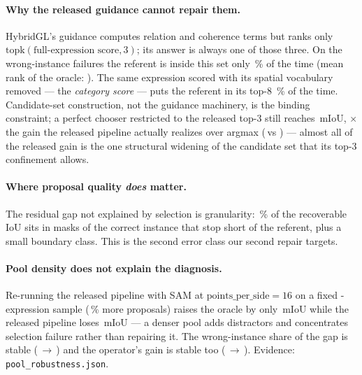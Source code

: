 \paragraph{Why the released guidance cannot repair them.}
HybridGL's guidance computes relation and coherence terms but ranks only
$\mathrm{topk}(\text{full-expression score}, 3)$; its answer is always one of
those three. On the wrong-instance failures the referent is inside this set
only \oracleInTopThreePct\,\% of the time (mean rank of the oracle:
\meanOracleRank). The same expression scored with its spatial vocabulary
removed --- the \emph{category score} --- puts the referent in its top-8
\goodSetPct\,\% of the time. Candidate-set construction, not the guidance
machinery, is the binding constraint; a perfect chooser restricted to the
released top-3 still reaches \topThreeCeiling\,mIoU, \topThreeCeilingRatio$\times$
the gain the released pipeline actually realizes over argmax
(\relMIoU\,vs \argmaxMIoU) --- almost all of the released gain is the one
structural widening of the candidate set that its top-3 confinement allows.

\paragraph{Where proposal quality \emph{does} matter.}
The residual gap not explained by selection is granularity:
\usSharePct\,\% of the recoverable IoU sits in masks of the correct instance
that stop short of the referent, plus a small boundary class. This is the
second error class our second repair targets.

\paragraph{Pool density does not explain the diagnosis.}
Re-running the released pipeline with SAM at $\text{points\_per\_side}=16$ on
a fixed \ppsN-expression sample (\ppsProposalDelta\,\% more proposals) raises
the oracle by only \ppsOracleDelta\,mIoU while the released pipeline loses
\ppsGuidedDelta\,mIoU --- a denser pool adds distractors and concentrates
selection failure rather than repairing it. The wrong-instance share of the
gap is stable (\ppsWiEight\,$\to$\,\ppsWiSixteen) and the operator's gain is
stable too (\ppsOursEight\,$\to$\,\ppsOursSixteen). Evidence:
\texttt{pool\_robustness.json}.
